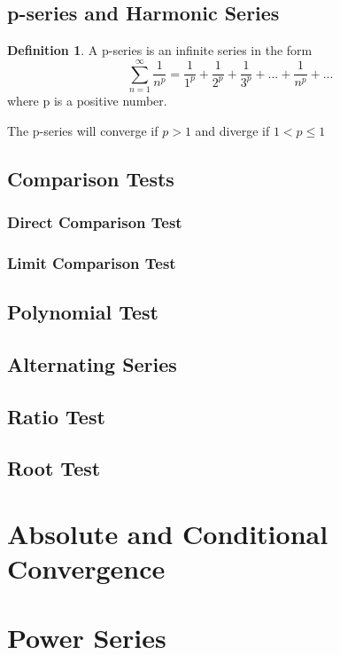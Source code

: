\documentclass[letterpaper]{report}
\theoremstyle{definition}
\newtheorem{definition}{Definition}
\begin{document}
\subsection{p-series and Harmonic Series}
\begin{definition}
A p-series is an infinite series in the form
\[ \sum_{n=1}^\infty \frac{1}{n^p}=\frac{1}{1^p}+\frac{1}{2^p}
    +\frac{1}{3^p}+...+\frac{1}{n^p}+... \]
where p is a positive number.
\end{definition}
The p-series will converge if $p>1$ and diverge if $1<p\leq1$

\subsection{Comparison Tests}

\subsubsection{Direct Comparison Test}

\subsubsection{Limit Comparison Test}

\subsection{Polynomial Test}

\subsection{Alternating Series}

\subsection{Ratio Test}

\subsection{Root Test}

\section{Absolute and Conditional Convergence}

\section{Power Series}
\end{document}
